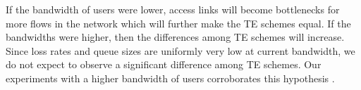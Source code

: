 If the bandwidth of users were lower, access links will become bottlenecks for more flows in the network which will further make the TE schemes equal. If the bandwidths were higher, then the differences among TE schemes will increase.  Since loss rates and queue sizes are uniformly very low at current bandwidth, we do not expect to observe a significant difference among TE schemes. Our experiments with a higher bandwidth of users corroborates this hypothesis \cite{TR}.





